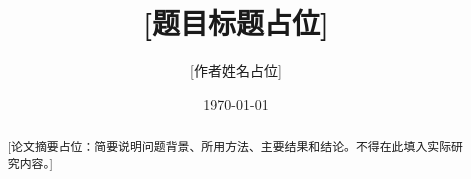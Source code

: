 \documentclass[12pt,a4paper]{ctexart}
\title{[题目标题占位]}
\author{[作者姓名占位]}
\date{\today}
\begin{document}
\maketitle

\begin{abstract}
  [论文摘要占位：简要说明问题背景、所用方法、主要结果和结论。不得在此填入实际研究内容。]
\end{abstract}

\tableofcontents

\newpage









\end{document}

